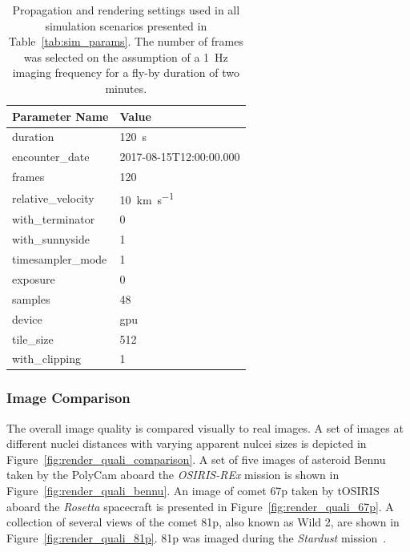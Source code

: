 \begin{table}[htb]
    \centering
    \caption{Propagation and rendering settings used in all simulation scenarios presented in Table~\ref{tab:sim_params}. The number of frames was selected on the assumption of a \SI{1}{\hertz} imaging frequency for a fly-by duration of two minutes.}
    \label{tab:sim_settings}
    \begin{tabular}{l|l}
        \textbf{Parameter Name} & \textbf{Value} \\ \hline
        duration       & \SI{120}{\second}   \\
        encounter\_date & 2017-08-15T12:00:00.000\\
        frames       & \SI{120}{}     \\
        relative\_velocity     &  \SI{10}{\kilo\meter\per\second} \\
        with\_terminator  & \SI{0}{} \\
        with\_sunnyside & \SI{1}{} \\
        timesampler\_mode & \SI{1}{} \\
        exposure & \SI{0}{} \\
        samples & \SI{48}{} \\
        device & \gls{gpu} \\
        tile\_size & \SI{512}{} \\
        with\_clipping & \SI{1}{}
    \end{tabular}
\end{table}

\subsubsection{Image Comparison}
The overall image quality is compared visually to real images. A set of images at different nuclei distances with varying apparent nulcei sizes is depicted in Figure~\ref{fig:render_quali_comparison}. A set of five images of asteroid Bennu taken by the PolyCam aboard the \textit{OSIRIS-REx} mission is shown in Figure~\ref{fig:render_quali_bennu}. An image of comet \gls{67p} taken by tOSIRIS aboard the \textit{Rosetta} spacecraft is presented in Figure~\ref{fig:render_quali_67p}. A collection of several views of the comet \gls{81p}, also known as Wild 2, are shown in Figure~\ref{fig:render_quali_81p}. \Gls{81p} was imaged during the \textit{Stardust} mission~\cite{Brownlee2003Stardust:Mission}.

